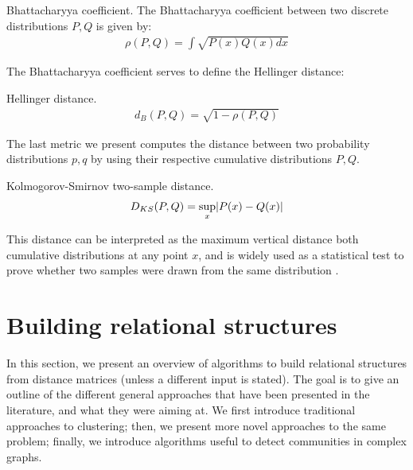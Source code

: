 \documentclass[../main.tex]{subfiles} \label{chapter_soa}
\begin{document}
\begin{definition}{Bhattacharyya coefficient.} \label{def_bhattacharyyacoef}
The Bhattacharyya coefficient between two discrete distributions $P, Q$ is given by:
\begin{align*}
\rho(P, Q) = \int{\sqrt{P(x)Q(x)dx}}
\end{align*}
\end{definition}
\par The Bhattacharyya coefficient serves to define the Hellinger distance:
\begin{definition}{Hellinger distance.} \label{def_bhattacharyya}
\begin{align*}
d_B(P, Q) = \sqrt{1 - \rho(P, Q)}
\end{align*}
\end{definition}

\par The last metric we present computes the distance between two probability distributions $p, q$ by using their respective cumulative distributions $P, Q$.
\begin{definition}{Kolmogorov-Smirnov two-sample distance.} \label{def_ks2s}
\begin{align*}
D_{KS}(P, Q) = \sup_{x}\lvert P(x)-Q(x)\rvert
\end{align*}
\end{definition}
\par This distance can be interpreted as the maximum vertical distance both cumulative distributions at any point $x$, and is widely used as a statistical test to prove whether two samples were drawn from the same distribution \cite{KSMathworks2015}.



\section{Building relational structures}\label{algorithms_review}
In this section, we present an overview of algorithms to build relational structures from distance matrices (unless a different input is stated). The goal is to give an outline of the different general approaches that have been presented in the literature, and what they were aiming at. We first introduce traditional approaches to clustering; then, we present more novel approaches to the same problem; finally, we introduce algorithms useful to detect communities in complex graphs.
\end{document}
